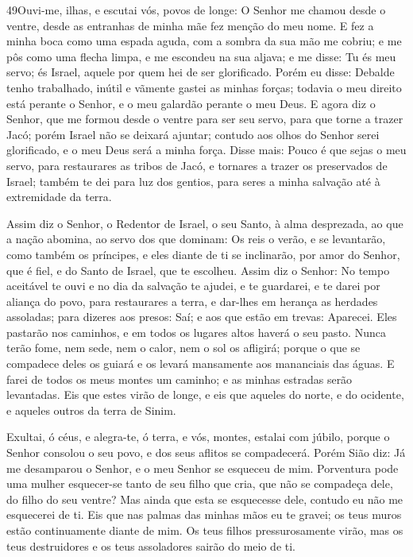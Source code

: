 \medskip

\lettrine{49}{}Ouvi-me, ilhas, e escutai vós, povos de longe: O
Senhor me chamou desde o ventre, desde as entranhas de minha mãe fez
menção do meu nome. E fez a minha boca como uma espada aguda,
com a sombra da sua mão me cobriu; e me pôs como uma flecha limpa, e
me escondeu na sua aljava; e me disse: Tu és meu servo; és
Israel, aquele por quem hei de ser glorificado. Porém eu disse:
Debalde tenho trabalhado, inútil e vãmente gastei as minhas forças;
todavia o meu direito está perante o Senhor, e o meu galardão
perante o meu Deus. E agora diz o Senhor, que me formou desde o
ventre para ser seu servo, para que torne a trazer Jacó; porém
Israel não se deixará ajuntar; contudo aos olhos do Senhor serei
glorificado, e o meu Deus será a minha força. Disse mais: Pouco
é que sejas o meu servo, para restaurares as tribos de Jacó, e
tornares a trazer os preservados de Israel; também te dei para luz
dos gentios, para seres a minha salvação até à extremidade da terra.

Assim diz o Senhor, o Redentor de Israel, o seu Santo, à alma
desprezada, ao que a nação abomina, ao servo dos que dominam: Os
reis o verão, e se levantarão, como também os príncipes, e eles
diante de ti se inclinarão, por amor do Senhor, que é fiel, e do
Santo de Israel, que te escolheu. Assim diz o Senhor: No tempo
aceitável te ouvi e no dia da salvação te ajudei, e te guardarei, e
te darei por aliança do povo, para restaurares a terra, e dar-lhes
em herança as herdades assoladas; para dizeres aos presos: Saí;
e aos que estão em trevas: Aparecei. Eles pastarão nos caminhos, e
em todos os lugares altos haverá o seu pasto. Nunca terão
fome, nem sede, nem o calor, nem o sol os afligirá; porque o que se
compadece deles os guiará e os levará mansamente aos mananciais das
águas. E farei de todos os meus montes um caminho; e as
minhas estradas serão levantadas. Eis que estes virão de
longe, e eis que aqueles do norte, e do ocidente, e aqueles outros
da terra de Sinim.

Exultai, ó céus, e alegra-te, ó terra, e vós, montes, estalai com
júbilo, porque o Senhor consolou o seu povo, e dos seus aflitos se
compadecerá. Porém Sião diz: Já me desamparou o Senhor, e o
meu Senhor se esqueceu de mim. Porventura pode uma mulher
esquecer-se tanto de seu filho que cria, que não se compadeça dele,
do filho do seu ventre? Mas ainda que esta se esquecesse dele,
contudo eu não me esquecerei de ti. Eis que nas palmas das
minhas mãos eu te gravei; os teus muros estão continuamente diante
de mim. Os teus filhos pressurosamente virão, mas os teus
destruidores e os teus assoladores sairão do meio de ti.

